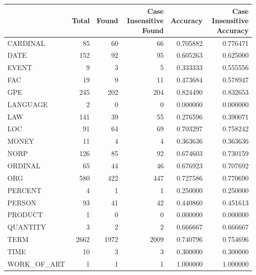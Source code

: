 \begin{tabular}{lrrrrr}
\toprule
 & Total & Found & Case Insensitive Found & Accuracy & Case Insensitive Accuracy \\
\midrule
CARDINAL & 85 & 60 & 66 & 0.705882 & 0.776471 \\
DATE & 152 & 92 & 95 & 0.605263 & 0.625000 \\
EVENT & 9 & 3 & 5 & 0.333333 & 0.555556 \\
FAC & 19 & 9 & 11 & 0.473684 & 0.578947 \\
GPE & 245 & 202 & 204 & 0.824490 & 0.832653 \\
LANGUAGE & 2 & 0 & 0 & 0.000000 & 0.000000 \\
LAW & 141 & 39 & 55 & 0.276596 & 0.390071 \\
LOC & 91 & 64 & 69 & 0.703297 & 0.758242 \\
MONEY & 11 & 4 & 4 & 0.363636 & 0.363636 \\
NORP & 126 & 85 & 92 & 0.674603 & 0.730159 \\
ORDINAL & 65 & 44 & 46 & 0.676923 & 0.707692 \\
ORG & 580 & 422 & 447 & 0.727586 & 0.770690 \\
PERCENT & 4 & 1 & 1 & 0.250000 & 0.250000 \\
PERSON & 93 & 41 & 42 & 0.440860 & 0.451613 \\
PRODUCT & 1 & 0 & 0 & 0.000000 & 0.000000 \\
QUANTITY & 3 & 2 & 2 & 0.666667 & 0.666667 \\
TERM & 2662 & 1972 & 2009 & 0.740796 & 0.754696 \\
TIME & 10 & 3 & 3 & 0.300000 & 0.300000 \\
WORK_OF_ART & 1 & 1 & 1 & 1.000000 & 1.000000 \\
\bottomrule
\end{tabular}
